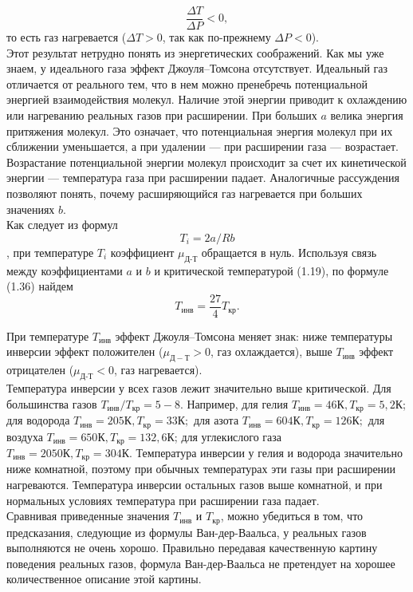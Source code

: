 \documentclass[a4paper, 12pt]{article}%
\begin{document}
	\begin{equation}
		\dfrac{\Delta T}{\Delta P} < 0,
	\end{equation}
	то есть газ нагревается ($\Delta T > 0$, так как по-прежнему $\Delta P < 0$).\\
	Этот результат нетрудно понять из энергетических соображений. Как мы уже знаем, у идеального газа эффект Джоуля–Томсона отсутствует. Идеальный газ отличается от реального тем, что в нем можно пренебречь потенциальной энергией взаимодействия молекул. Наличие этой энергии приводит к охлаждению или нагреванию реальных газов при расширении. При больших $a$ велика энергия притяжения молекул. Это означает, что потенциальная энергия молекул при их сближении уменьшается, а при удалении --- при расширении газа --- возрастает. Возрастание потенциальной энергии молекул происходит за счет их кинетической энергии --- температура газа при расширении падает. Аналогичные рассуждения позволяют понять, почему расширяющийся газ нагревается при больших значениях $b$.\\
	Как следует из формул $$ T_i = 2a/Rb$$, при температуре $T_i$ коэффициент $\mu_{\text{Д-Т}} $ обращается в нуль. Используя связь между коэффициентами $a$ и $b$ и критической температурой (1.19), по формуле (1.36) найдем
	\begin{equation}
		T_{\text{инв}} = \dfrac{27}{4}T_{\text{кр}}.
	\end{equation}
	
	
	При температуре $T_{\text{инв}}$ эффект Джоуля–Томсона меняет знак: ниже температуры инверсии эффект положителен ($\mu_{Д-Т} > 0$, газ охлаждается), выше $T_{\text{инв}}$ эффект отрицателен ($\mu_{\text{Д-Т}} < 0$, газ нагревается).\\
	
	Температура инверсии у всех газов лежит значительно выше критической. Для большинства газов $T_{инв}/T_{кр} = 5-8$. Например, для гелия $T_{инв} = 46К, T_{кр} = 5,2К$; для водорода $T_{инв} = 205К, T_{кр }= 33К;$ для азота $T_{инв} = 604 К, T_{кр} = 126 К;$ для воздуха $T_{инв} = 650 К, T_{кр} = 132,6 К$; для углекислого газа $T_{инв} = 2050 К, T_{кр} = 304 К.$ Температура инверсии у гелия и водорода значительно ниже комнатной, поэтому при обычных температурах эти газы при расширении нагреваются. Температура инверсии остальных газов выше комнатной, и при нормальных условиях температура при расширении газа падает.\\
	
	Сравнивая приведенные значения $T_{инв}$ и $T_{кр}$, можно убедиться в том, что предсказания, следующие из формулы Ван-дер-Ваальса, у реальных газов выполняются не очень хорошо. Правильно передавая качественную картину поведения реальных газов, формула Ван-дер-Ваальса не претендует на хорошее количественное описание этой картины.\\
	
\end{document}
